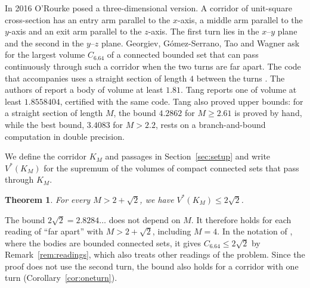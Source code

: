 \documentclass[11pt]{amsart}
\newtheorem{theorem}{Theorem}[section]
\theoremstyle{definition}
\theoremstyle{remark}
\numberwithin{equation}{section}
\begin{document}
In 2016 O'Rourke \cite{ORo16} posed a three-dimensional version. A corridor of unit-square cross-section has an entry arm parallel to the $x$-axis, a middle arm parallel to the $y$-axis and an exit arm parallel to the $z$-axis. The first turn lies in the $x$--$y$ plane and the second in the $y$--$z$ plane. Georgiev, G\'omez-Serrano, Tao and Wagner \cite[Problem~6.64]{GGTW25} ask for the largest volume $C_{6.64}$ of a connected bounded set that can pass continuously through such a corridor when the two turns are far apart. The code that accompanies \cite{GGTW25} uses a straight section of length $4$ between the turns \cite[Definition~2.1]{Tan26a}. The authors of \cite{GGTW25} report a body of volume at least $1.81$. Tang \cite{Tan26b} reports one of volume at least $1.8558404$, certified with the same code. Tang \cite{Tan26a} also proved upper bounds: for a straight section of length $M$, the bound $4.2862$ for $M\ge2.61$ is proved by hand, while the best bound, $3.4083$ for $M>2.2$, rests on a branch-and-bound computation in double precision.

We define the corridor $K_M$ and passages in Section~\ref{sec:setup} and write $V^*(K_M)$ for the supremum of the volumes of compact connected sets that pass through $K_M$.

\begin{theorem}\label{thm:main}
For every $M>2+\sqrt2$, we have $V^*(K_M)\le 2\sqrt2$.
\end{theorem}

The bound $2\sqrt2=2.8284\ldots$ does not depend on $M$. It therefore holds for each reading of ``far apart'' with $M>2+\sqrt2$, including $M=4$. In the notation of \cite{GGTW25}, where the bodies are bounded connected sets, it gives $C_{6.64}\le2\sqrt2$ by Remark~\ref{rem:readings}, which also treats other readings of the problem. Since the proof does not use the second turn, the bound also holds for a corridor with one turn (Corollary~\ref{cor:oneturn}).
\end{document}
